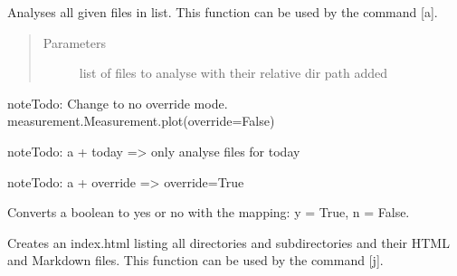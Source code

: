 \documentclass[letterpaper,10pt,english]{sphinxmanual}
\begin{document}
\begin{fulllineitems}
\label{\detokenize{pigor:pigor.analyse_files}}
Analyses all given files in list. This function can be used by the command {[}a{]}.
\begin{quote}\begin{description}
\item[{Parameters}] \leavevmode
{} \textendash{} list of files to analyse with
their relative dir path added

\end{description}\end{quote}

\begin{sphinxadmonition}{note}{\label{pigor:index-0}Todo:}
Change to no override mode. measurement.Measurement.plot(override=False)
\end{sphinxadmonition}

\begin{sphinxadmonition}{note}{\label{pigor:index-1}Todo:}
a + today =\textgreater{} only analyse files for today
\end{sphinxadmonition}

\begin{sphinxadmonition}{note}{\label{pigor:index-2}Todo:}
a + override =\textgreater{} override=True
\end{sphinxadmonition}

\end{fulllineitems}


\begin{fulllineitems}
\label{\detokenize{pigor:pigor.bool2yn}}
Converts a boolean to yes or no with the mapping: y = True, n = False.

\end{fulllineitems}


\begin{fulllineitems}
\label{\detokenize{pigor:pigor.create_index}}
Creates an index.html listing all directories and subdirectories and their HTML and Markdown files. This function can be used by the command {[}j{]}.

\end{fulllineitems}
\end{document}
